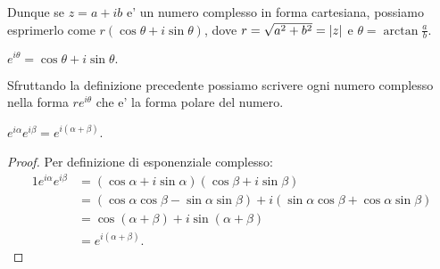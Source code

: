 Dunque se $z = a+ib$ e' un numero complesso in forma cartesiana, possiamo esprimerlo come $r(\cos\theta + i\sin\theta)$, dove $r = \sqrt{a^2 + b^2} = \left|z\right|$ e $\theta = \arctan \frac{a}{b}$.

\begin{definition}
    $e^{i\theta} = \cos\theta + i\sin\theta.$
\end{definition}

Sfruttando la definizione precedente possiamo scrivere ogni numero complesso nella forma $re^{i\theta}$ che e' la forma polare del numero.

\begin{proposition}
    $e^{i\alpha} e^{i\beta} = e^{i(\alpha + \beta)}$.
\end{proposition}
\begin{proof}
    Per definizione di esponenziale complesso:
    \begin{alignat*}{1}
        e^{i\alpha} e^{i\beta} &= (\cos\alpha + i\sin\alpha)(\cos\beta + i\sin\beta)\\
        &= (\cos\alpha \cos\beta - \sin\alpha \sin\beta) + i(\sin\alpha \cos\beta + \cos\alpha \sin\beta)\\
        &= \cos(\alpha + \beta) + i\sin(\alpha + \beta)\\
        &= e^{i(\alpha + \beta)}. \tag*{\qedhere}
    \end{alignat*}
\end{proof}